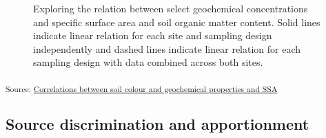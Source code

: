 \documentclass[
  number]{elsarticle}
\begin{document}
\begin{figure}[H]


\caption{\label{fig-geochem-corr}Exploring the relation between select
geochemical concentrations and specific surface area and soil organic
matter content. Solid lines indicate linear relation for each site and
sampling design independently and dashed lines indicate linear relation
for each sampling design with data combined across both sites.}

\end{figure}%

\textsubscript{Source:
\href{https://alex-koiter.github.io/sampling-design-manuscript/notebooks/correlation-preview.html\#cell-fig-geochem-corr}{Correlations
between soil colour and geochemical properties and SSA}}

\subsection{Source discrimination and
apportionment}\label{source-discrimination-and-apportionment}
\end{document}
